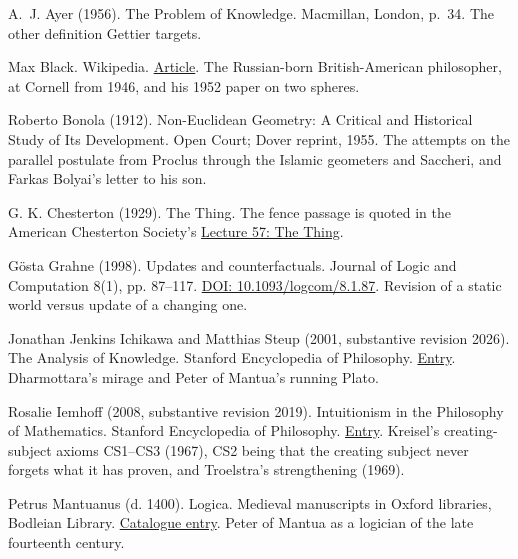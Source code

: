 \documentclass[11pt,twoside]{article}
\theoremstyle{thielethm}
\theoremstyle{thieledef}
\theoremstyle{thieledef}
\theoremstyle{thieledef}
\theoremstyle{thielethm}
\theoremstyle{thieleobs}
\theoremstyle{thielethm}
\begin{document}
\noindent A.~J. Ayer (1956). The Problem of Knowledge. Macmillan, London, p.~34. The other definition Gettier targets.
\par\medskip

\noindent Max Black. Wikipedia. \href{https://en.wikipedia.org/wiki/Max_Black}{Article}. The Russian-born British-American philosopher, at Cornell from 1946, and his 1952 paper on two spheres.
\par\medskip

\noindent Roberto Bonola (1912). Non-Euclidean Geometry: A Critical and Historical Study of Its Development. Open Court; Dover reprint, 1955. The attempts on the parallel postulate from Proclus through the Islamic geometers and Saccheri, and Farkas Bolyai's letter to his son.
\par\medskip

\noindent G. K. Chesterton (1929). The Thing. The fence passage is quoted in the American Chesterton Society's \href{https://www.chesterton.org/lecture-57/}{Lecture 57: The Thing}.
\par\medskip

\noindent G\"osta Grahne (1998). Updates and counterfactuals. Journal of Logic and Computation 8(1), pp. 87--117. \href{https://doi.org/10.1093/logcom/8.1.87}{DOI: 10.1093/logcom/8.1.87}. Revision of a static world versus update of a changing one.
\par\medskip

\noindent Jonathan Jenkins Ichikawa and Matthias Steup (2001, substantive revision 2026). The Analysis of Knowledge. Stanford Encyclopedia of Philosophy. \href{https://plato.stanford.edu/entries/knowledge-analysis/}{Entry}. Dharmottara's mirage and Peter of Mantua's running Plato.
\par\medskip

\noindent Rosalie Iemhoff (2008, substantive revision 2019). Intuitionism in the Philosophy of Mathematics. Stanford Encyclopedia of Philosophy. \href{https://plato.stanford.edu/entries/intuitionism/}{Entry}. Kreisel's creating-subject axioms CS1--CS3 (1967), CS2 being that the creating subject never forgets what it has proven, and Troelstra's strengthening (1969).
\par\medskip

\noindent Petrus Mantuanus (d. 1400). Logica. Medieval manuscripts in Oxford libraries, Bodleian Library. \href{https://medieval.bodleian.ox.ac.uk/catalog/work_3607}{Catalogue entry}. Peter of Mantua as a logician of the late fourteenth century.
\par\medskip
\end{document}

